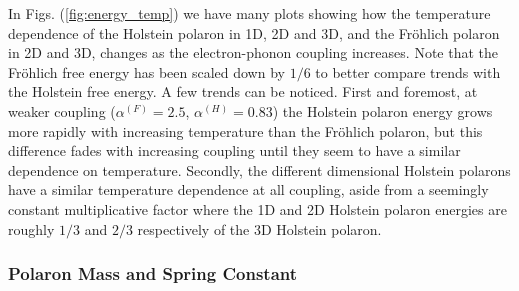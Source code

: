 In Figs. (\ref{fig:energy_temp}) we have many plots showing how the temperature dependence of the Holstein polaron in 1D, 2D and 3D, and the Fr\"ohlich polaron in 2D and 3D, changes as the electron-phonon coupling increases. Note that the Fr\"ohlich free energy has been scaled down by $1/6$ to better compare trends with the Holstein free energy. A few trends can be noticed. First and foremost, at weaker coupling ($\alpha^{(F)} = 2.5$, $\alpha^{(H)} = 0.83$) the Holstein polaron energy grows more rapidly with increasing temperature than the Fr\"ohlich polaron, but this difference fades with increasing coupling until they seem to have a similar dependence on temperature. Secondly, the different dimensional Holstein polarons have a similar temperature dependence at all coupling, aside from a seemingly constant multiplicative factor where the 1D and 2D Holstein polaron energies are roughly $1/3$ and $2/3$ respectively of the 3D Holstein polaron. 

\subsubsection{Polaron Mass and Spring Constant}

